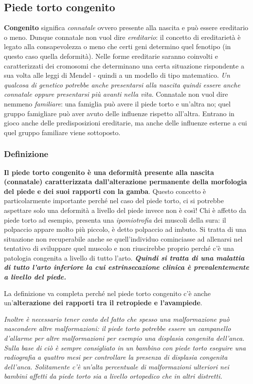 \subsection{Piede torto congenito}

\textbf{Congenito} significa \emph{connatale} ovvero presente alla nascita e può essere ereditario o meno. Dunque connatale non vuol dire \emph{ereditario}: il concetto di ereditarietà è legato alla consapevolezza o meno che certi geni determino quel fenotipo (in questo caso quella deformità). Nelle forme ereditarie saranno coinvolti e caratterizzati dei cromosomi che determinano una certa situazione rispondente a sua volta alle leggi di Mendel - quindi a un modello di tipo matematico. \emph{Un qualcosa di genetico potrebbe anche presentarsi alla nascita quindi essere anche connatale oppure presentarsi più avanti nella vita}. Connatale non vuol dire nemmeno
\emph{familiare}: una famiglia può avere il piede torto e un'altra no; quel gruppo famigliare può aver avuto delle influenze rispetto all'altra. Entrano in gioco anche delle predisposizioni ereditarie, ma anche delle influenze esterne a cui quel gruppo familiare viene sottoposto.

\subsubsection{Definizione}

\textbf{Il piede torto congenito è una deformità presente alla nascita (connatale) caratterizzata dall'alterazione permanente della morfologia del piede e dei suoi rapporti con la gamba}. Questo concetto è particolarmente importante perché nel caso del piede torto, ci si
potrebbe aspettare solo una deformità a livello del piede invece non è così! Chi è affetto da piede torto ad esempio, presenta una \emph{ipomiotrofia} dei muscoli della sura: il polpaccio appare molto più piccolo, è detto polpaccio ad imbuto. Si tratta di una situazione
non recuperabile anche se quell'individuo cominciasse ad allenarsi nel tentativo di sviluppare quel muscolo e non riuscirebbe proprio perché c'è una patologia congenita a livello di tutto l'arto.
\emph{\textbf{Quindi si tratta di una malattia di tutto l'arto inferiore \emph{la cui estrinsecazione clinica è prevalentemente a livello del piede.}} }

La definizione va completa perché nel piede torto congenito c'è anche un'\textbf{alterazione dei rapporti tra il retropiede e l'avampiede}.

\emph{Inoltre è necessario tener conto del fatto che spesso una malformazione può nascondere altre malformazioni: il piede torto potrebbe essere un campanello d'allarme per altre malformazioni per
esempio una displasia congenita dell'anca. Sulla base di ciò è sempre consigliato in un bambino con piede torto eseguire una radiografia a quattro mesi per controllare la presenza di displasia congenita dell'anca. Solitamente c'è un'alta percentuale di malformazioni ulteriori nei bambini affetti da piede torto sia a livello ortopedico che in altri distretti.}

